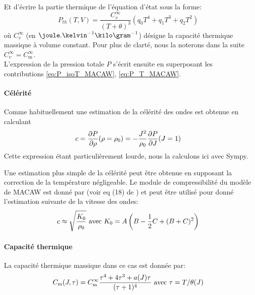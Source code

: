 \documentclass[10pt]{book}
\newcommand{\Cm}{C_{\mathrm{m}}}
\begin{document}
Et d'écrire la partie thermique de l'équation d'état sous la forme:
\begin{equation}
P_{th}(T,V)=\dfrac{C_{v}^{\infty}}{(T+\theta)^{3}}\left(q_{0}T^{4}+q_{1}T^{3}+q_{2}T^{2}\right)
\label{eq:P_T_MACAW}
\end{equation}
où $C_{v}^{\infty}$ (en $\joule.\kelvin^{-1}\kilo\gram^{-1}$) désigne la capacité thermique massique à volume constant. Pour plus de clarté, nous la noterons dans la suite $C_{v}^{\infty} = \Cm^{\infty}$.\\

L'expression de la pression totale $P$ s'écrit ensuite en superposant les contributions \eqref{eq:P_isoT_MACAW}, \eqref{eq:P_T_MACAW}.
\paragraph{Célérité}
Comme habituellement une estimation de la célérité des ondes est obtenue en calculant 
$$c = \dfrac{\partial P}{\partial \rho}(\rho = \rho_{0})=-\dfrac{J^{2}}{\rho_{0}}\dfrac{\partial P}{\partial J}(J=1)$$
Cette expression étant particulièrement lourde, nous la calculons ici avec Sympy.

Une estimation plus simple de la célérité peut être obtenue en supposant la correction de la température négligeable. Le module de compressibilité du modèle de MACAW est donné par (voir eq (18) de \cite{lozano2022robust}) et peut être utilisé pour donné l'estimation suivante de la vitesse des ondes:
$$c\approx \sqrt{\dfrac{K_{0}}{\rho_{0}}} \text{ avec } K_{0}=A\left(B-\dfrac{1}{2}C+(B+C)^{2}\right)$$
\paragraph{Capacité thermique} La capacité thermique massique dans ce cas est donnée par:
$$\Cm(\J,\tau)=\Cm^{\infty}\dfrac{\tau^{4}+4\tau^{3}+a(\J)\tau}{(\tau+1)^{4}} \avec \tau = T/\theta(\J)$$
\end{document}
